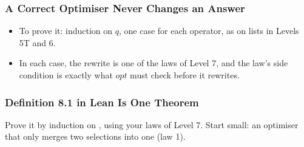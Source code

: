 \documentclass{ltx-talk}
\begin{document}
\begin{frame}
  \frametitle{A Correct Optimiser Never Changes an Answer}
  \begin{itemize}
    \item To prove it: induction on $q$, one case for each operator, as on
      lists in Levels 5T and 6.
    \item In each case, the rewrite is one of the laws of Level 7, and the
      law's side condition is exactly what $\mathit{opt}$ must check before
      it rewrites.
  \end{itemize}
\end{frame}

\begin{frame*}
  \frametitle{Definition 8.1 in Lean Is One Theorem}
  \sketch
  Prove it by induction on , using your laws of Level 7. Start
  small: an optimiser that only merges two selections into one (law 1).
\end{frame*}
\end{document}

